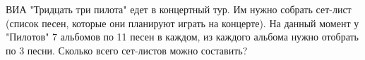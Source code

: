 \question
ВИА "Тридцать три пилота" едет в концертный тур. Им нужно собрать сет-лист (список песен, которые они планируют играть на концерте). На данный момент у "Пилотов" 7 альбомов по 11 песен в каждом, из каждого альбома нужно отобрать по 3 песни. Сколько всего сет-листов можно составить?

